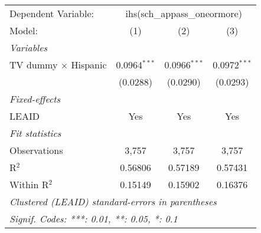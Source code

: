 \begin{tabular}{lccc}
\tabularnewline\midrule\midrule
Dependent Variable:&\multicolumn{3}{c}{ihs(sch\_appass\_oneormore)}\\
Model:&(1) & (2) & (3)\\
\midrule \emph{Variables}&   &   &  \\
TV dummy $\times$ Hispanic & 0.0964$^{***}$ & 0.0966$^{***}$ & 0.0972$^{***}$\\
  &(0.0288) & (0.0290) & (0.0293)\\
\midrule \emph{Fixed-effects}&   &   &  \\
LEAID & Yes & Yes & Yes\\
\midrule \emph{Fit statistics}&  & & \\
Observations & 3,757&3,757&3,757\\
R$^2$ & 0.56806&0.57189&0.57431\\
Within R$^2$ & 0.15149&0.15902&0.16376\\
\midrule\midrule\multicolumn{4}{l}{\emph{Clustered (LEAID) standard-errors in parentheses}}\\
\multicolumn{4}{l}{\emph{Signif. Codes: ***: 0.01, **: 0.05, *: 0.1}}\\
\end{tabular}


